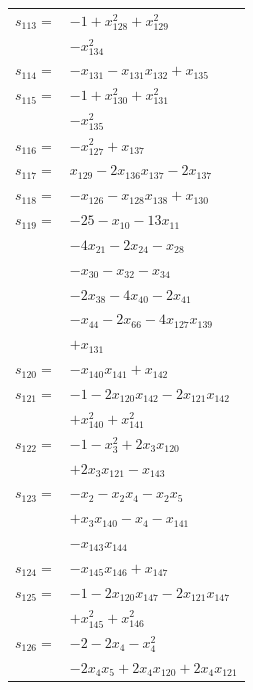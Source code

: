 \begin{longtable}{@{}r@{\;}l@{}}
\(s_{113}=\) & \(\displaystyle -1 +x_{128}^{2} +x_{129}^{2}\) \\
 & \(\displaystyle -x_{134}^{2}\) \\[3pt]
\(s_{114}=\) & \(\displaystyle -x_{131} -x_{131}x_{132} +x_{135}\) \\[3pt]
\(s_{115}=\) & \(\displaystyle -1 +x_{130}^{2} +x_{131}^{2}\) \\
 & \(\displaystyle -x_{135}^{2}\) \\[3pt]
\(s_{116}=\) & \(\displaystyle -x_{127}^{2} +x_{137}\) \\[3pt]
\(s_{117}=\) & \(\displaystyle x_{129} -2x_{136}x_{137} -2x_{137}\) \\[3pt]
\(s_{118}=\) & \(\displaystyle -x_{126} -x_{128}x_{138} +x_{130}\) \\[3pt]
\(s_{119}=\) & \(\displaystyle -25 -x_{10} -13x_{11}\) \\
 & \(\displaystyle -4x_{21} -2x_{24} -x_{28}\) \\
 & \(\displaystyle -x_{30} -x_{32} -x_{34}\) \\
 & \(\displaystyle -2x_{38} -4x_{40} -2x_{41}\) \\
 & \(\displaystyle -x_{44} -2x_{66} -4x_{127}x_{139}\) \\
 & \(\displaystyle +x_{131}\) \\[3pt]
\(s_{120}=\) & \(\displaystyle -x_{140}x_{141} +x_{142}\) \\[3pt]
\(s_{121}=\) & \(\displaystyle -1 -2x_{120}x_{142} -2x_{121}x_{142}\) \\
 & \(\displaystyle +x_{140}^{2} +x_{141}^{2}\) \\[3pt]
\(s_{122}=\) & \(\displaystyle -1 -x_{3}^{2} +2x_{3}x_{120}\) \\
 & \(\displaystyle +2x_{3}x_{121} -x_{143}\) \\[3pt]
\(s_{123}=\) & \(\displaystyle -x_{2} -x_{2}x_{4} -x_{2}x_{5}\) \\
 & \(\displaystyle +x_{3}x_{140} -x_{4} -x_{141}\) \\
 & \(\displaystyle -x_{143}x_{144}\) \\[3pt]
\(s_{124}=\) & \(\displaystyle -x_{145}x_{146} +x_{147}\) \\[3pt]
\(s_{125}=\) & \(\displaystyle -1 -2x_{120}x_{147} -2x_{121}x_{147}\) \\
 & \(\displaystyle +x_{145}^{2} +x_{146}^{2}\) \\[3pt]
\(s_{126}=\) & \(\displaystyle -2 -2x_{4} -x_{4}^{2}\) \\
 & \(\displaystyle -2x_{4}x_{5} +2x_{4}x_{120} +2x_{4}x_{121}\) \\

\end{longtable}
